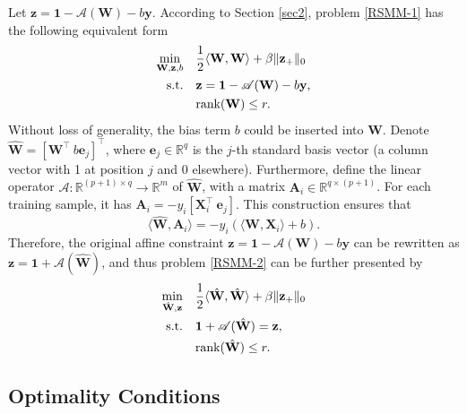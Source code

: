 \documentclass[sn-mathphys]{JORSC-jnl}%
\theoremstyle{thmstyleone}%
\theoremstyle{thmstylethree}%
\theoremstyle{thmstyleone} %
\begin{document}
Let $\mathbf{z}=\mathbf{1}-\mathscr{A}(\mathbf W)-b\mathbf{y}$. According to Section \ref{sec2}, problem \eqref{RSMM-1} has the following equivalent form
\begin{equation}\label{RSMM-2} 
\begin{aligned}
\min\limits_{\mathbf W,\mathbf{z},b}\quad&\frac{1}{2}\langle\mathbf W,\mathbf W\rangle+\beta\|{\mathbf{z}}_+\|_0\\
{\rm s.t.}\quad &\mathbf{z}=\mathbf{1}-\mathscr{A}(\mathbf W)-b\mathbf{y},\\
\quad & \text{rank}(\mathbf{W}) \leq r.
\end{aligned}
\end{equation}
Without loss of generality, the bias term $b$ could be inserted into $\mathbf{W}$. Denote $\hat{\mathbf{W}} = [ \mathbf{W}^\top ~ b \mathbf{e}_j]^\top$,
where $\mathbf{e}_j \in \mathbb{R}^q$ is the $j$-th standard basis vector (a column vector with 1 at position $j$ and 0 elsewhere). 
Furthermore, define the linear operator ${\mathscr{A}}: \mathbb{R}^{(p+1) \times q} \to \mathbb{R}^m$ of $\hat{\mathbf{W}}$,  with a matrix $\mathbf{A}_i \in \mathbb{R}^{q \times (p+1)}$. For each training sample, it has $\mathbf{A}_i = -y_i [
\mathbf{X}_i^\top~\mathbf{e}_j]$. This construction ensures that
\begin{equation*}
\langle \hat{\mathbf{W}}, \mathbf{A}_i \rangle = -y_i \left( \langle \mathbf{W}, \mathbf{X}_i \rangle + b \right).
\end{equation*}
Therefore, the original affine constraint $\mathbf{z} = \mathbf{1} - \mathscr{A}(\mathbf{W}) - b\mathbf{y}$ can be rewritten as $  \mathbf{z} = \mathbf{1} + {\mathscr{A}}(\hat{\mathbf{W}})$, and thus problem \eqref{RSMM-2} can be further presented by
\begin{equation}\label{RSMM3} 
	\begin{aligned}
        \min\limits_{\hat{\mathbf{W}},\mathbf{z}}\quad
		&\frac{1}{2}\langle\hat{\mathbf{W}},\hat{\mathbf{W}}\rangle+\beta\|{\mathbf{z}}_+\|_0\\
		{\rm s.t.}\quad &\mathbf{1}+\mathscr{A}(\hat{\mathbf{W}})=\mathbf{z},\\
		\quad & \text{rank}(\hat{\mathbf{W}}) \leq r.\\
	\end{aligned}
\end{equation}



\subsection{Optimality Conditions}
\end{document}
